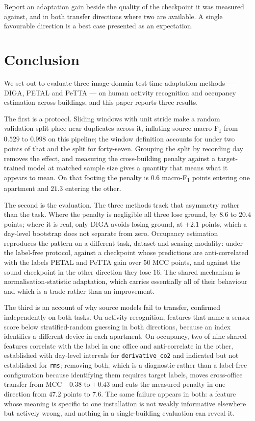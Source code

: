 \documentclass[a4paper,fleqn]{cas-dc}
\newcommand{\macf}{macro-F\textsubscript{1}}
\begin{document}
Report an adaptation gain beside the quality of the checkpoint it was measured against, and
in both transfer directions where two are available. A single favourable direction is a
best case presented as an expectation.

\section{Conclusion}
\label{sec:conclusion}

We set out to evaluate three image-domain test-time adaptation methods --- DIGA, PETAL and
PeTTA --- on human activity recognition and occupancy estimation across buildings, and this
paper reports three results.

The first is a protocol. Sliding windows with unit stride make a random validation split
place near-duplicates across it, inflating source \macf{} from $0.529$ to $0.998$ on this
pipeline; the window definition accounts for under two points of that and the split for
forty-seven. Grouping the split by recording day removes the effect, and measuring the
cross-building penalty against a target-trained model at matched sample size gives a
quantity that means what it appears to mean. On that footing the penalty is $0.6$ \macf{}
points entering one apartment and $21.3$ entering the other.

The second is the evaluation. The three methods track that asymmetry rather than the task.
Where the penalty is negligible all three lose ground, by $8.6$ to $20.4$ points; where it
is real, only DIGA avoids losing ground, at $+2.1$ points, which a day-level bootstrap does
not separate from zero. Occupancy estimation reproduces the pattern on a
different task, dataset and sensing modality: under the label-free protocol, against a
checkpoint whose predictions are anti-correlated with the labels PETAL and PeTTA gain over
$50$ MCC points, and against the sound checkpoint in the other direction they lose $16$. The shared mechanism is normalisation-statistic adaptation, which
carries essentially all of their behaviour and which is a trade rather than an improvement.

The third is an account of why source models fail to transfer, confirmed independently on
both tasks. On activity recognition, features that name a sensor score below
stratified-random guessing in both directions, because an index identifies a different
device in each apartment. On occupancy, two of nine shared features correlate with
the label in one office and anti-correlate in the other, established with day-level
intervals for \texttt{derivative\_co2} and indicated but not established for
\texttt{rms}; removing both, which is a diagnostic rather than a label-free configuration
because identifying them requires target labels, moves
cross-office transfer from MCC $-0.38$ to $+0.43$ and cuts the measured penalty in one
direction from $47.2$ points to $7.6$. The same failure appears in both: a feature whose meaning is specific to one
installation is not weakly informative elsewhere but actively wrong, and nothing in a
single-building evaluation can reveal it.
\end{document}
